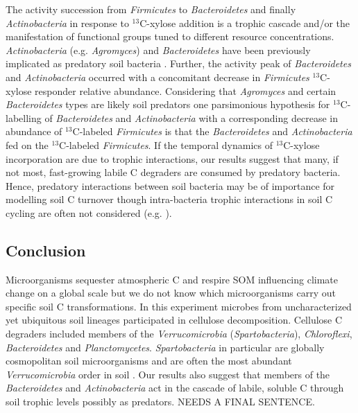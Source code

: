 The activity succession from \textit{Firmicutes} to \textit{Bacteroidetes} and
finally \textit{Actinobacteria} in response to $^{13}$C-xylose addition is
a trophic cascade and/or the manifestation of functional groups tuned to
different resource concentrations. \textit{Actinobacteria} (e.g.
\textit{Agromyces}) and \textit{Bacteroidetes} have been previously implicated
as predatory soil bacteria \citep{Lueders2006}. Further, the activity peak of
\textit{Bacteroidetes} and \textit{Actinobacteria} occurred with a concomitant
decrease in \textit{Firmicutes} $^{13}$C-xylose responder relative abundance.
Considering that \textit{Agromyces} and certain \textit{Bacteroidetes} types
are likely soil predators \citep{Lueders2006,16346402} one parsimonious
hypothesis for $^{13}$C-labelling of \textit{Bacteroidetes} and
\textit{Actinobacteria} with a corresponding decrease in abundance of
$^{13}$C-labeled \textit{Firmicutes} is that the \textit{Bacteroidetes} and
\textit{Actinobacteria} fed on the $^{13}$C-labeled \textit{Firmicutes}. If the
temporal dynamics of $^{13}$C-xylose incorporation are due to trophic
interactions, our results suggest that many, if not most, fast-growing labile
C degraders are consumed by predatory bacteria. Hence, predatory interactions
between soil bacteria may be of importance for modelling soil C turnover though
intra-bacteria trophic interactions in soil C cycling are often not considered
(e.g. \citep{Moore1988}).

\subsection{Conclusion} 
Microorganisms sequester atmospheric C and respire SOM influencing climate
change on a global scale but we do not know which microorganisms carry out
specific soil C transformations. In this experiment microbes from
uncharacterized yet ubiquitous soil lineages participated in cellulose
decomposition. Cellulose C degraders included members of the
\textit{Verrucomicrobia} (\textit{Spartobacteria}),
\textit{Chloroflexi}, \textit{Bacteroidetes} and \textit{Planctomycetes}.
\textit{Spartobacteria} in particular are globally cosmopolitan soil
microorganisms and are often the most abundant \textit{Verrucomicrobia}
order in soil \citep{Bergmann_2011}. Our results also suggest that
members of the \textit{Bacteroidetes} and \textit{Actinobacteria} act in
the cascade of labile, soluble C through soil trophic levels possibly as
predators. NEEDS A FINAL SENTENCE.
